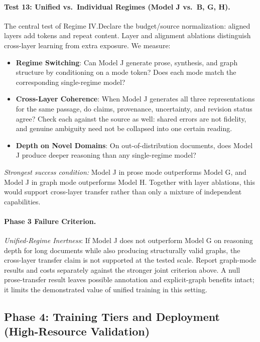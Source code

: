 \paragraph{Test 13: Unified vs.\ Individual Regimes (Model J vs.\ B, G, H).}
The central test of Regime IV.\@ Declare the budget/source normalization: aligned layers add tokens and
repeat content. Layer and alignment ablations distinguish cross-layer learning
from extra exposure. We measure:
\begin{itemize}
    \item \textbf{Regime Switching}: Can Model J generate prose, synthesis,
    and graph structure by conditioning on a mode token? Does each mode
    match the corresponding single-regime model?
    \item \textbf{Cross-Layer Coherence}: When Model J generates all three
    representations for the same passage, do claims, provenance, uncertainty,
    and revision status agree? Check each against the source as well: shared
    errors are not fidelity, and genuine ambiguity need not be collapsed into
    one certain reading.
    \item \textbf{Depth on Novel Domains}: On out-of-distribution documents,
    does Model J produce deeper reasoning than any single-regime model?
\end{itemize}
\emph{Strongest success condition:} Model J in prose mode outperforms
Model G, and Model J in graph mode outperforms Model H. Together with layer
ablations, this would support cross-layer transfer rather than only a mixture of
independent capabilities.

\paragraph{Phase 3 Failure Criterion.}
\emph{Unified-Regime Inertness}: If Model J does not outperform Model G on
reasoning depth for long documents while also producing structurally valid
graphs, the cross-layer transfer claim is not supported at the tested scale.
Report graph-mode results and costs separately against the stronger joint
criterion above. A null prose-transfer result leaves possible annotation and
explicit-graph benefits intact; it limits the demonstrated value of unified
training in this setting.


\subsection{Phase 4: Training Tiers and Deployment (High-Resource Validation)}\label{sec:phase4}

